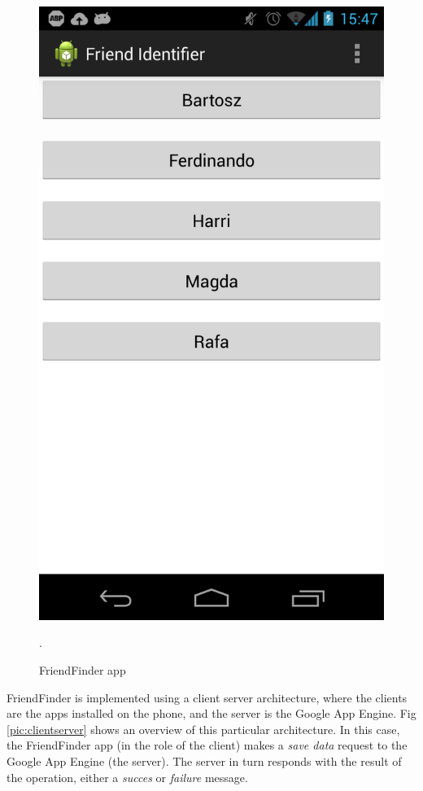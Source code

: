 \begin{figure}[h]
	\begin{center}
		\includegraphics[scale=0.2]{figures/ff.png}
	\end{center}
	
	\caption{FriendFinder app}.
	\label{pic:ff_prtscr}

\end{figure} 

FriendFinder is implemented using a client server architecture, where the clients are the apps installed on the phone, and the server is the Google App Engine. Fig \ref{pic:clientserver} shows an overview of this particular architecture. In this case, the FriendFinder app (in the role of the client) makes a \textit{save data} request to the Google App Engine (the server). The server in turn responds with the result of the operation, either a \textit{succes} or \textit{failure} message.  


